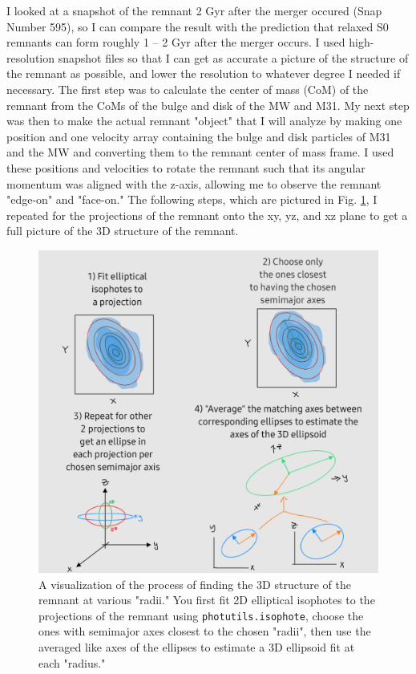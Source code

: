 \documentclass[twocolumn]{aastex631}
\begin{document}
I looked at a snapshot of the remnant 2 Gyr after the merger occured (Snap Number 595), so I can compare the result with the prediction that relaxed S0 remnants can form roughly 1 -- 2 Gyr after the merger occurs.
I used high-resolution snapshot files so that I can get as accurate a picture of the structure of the remnant as possible, and lower the resolution to whatever degree I needed if necessary.
The first step was to calculate the center of mass (CoM) of the remnant from the CoMs of the bulge and disk of the MW and M31. 
My next step was then to make the actual remnant "object" that I will analyze by making one position and one velocity array containing the bulge and disk particles of M31 and the MW and converting them to the remnant center of mass frame. 
I used these positions and velocities to rotate the remnant such that its angular momentum was aligned with the z-axis, allowing me to observe the remnant "edge-on" and "face-on."
The following steps, which are pictured in Fig. \ref{fig:methods}, I repeated for the projections of the remnant onto the xy, yz, and xz plane to get a full picture of the 3D structure of the remnant.
\begin{figure}[h!]
    \centering
    \includegraphics[width=0.8\linewidth]{methods.jpg}
    \caption{
        A visualization of the process of finding the 3D structure of the remnant at various "radii." You first fit 2D elliptical isophotes to the projections of the remnant using \texttt{photutils.isophote}, choose the ones with semimajor axes closest to the chosen "radii", then use the averaged like axes of the ellipses to estimate a 3D ellipsoid fit at each "radius."
    }
    \label{fig:methods}
\end{figure}
\end{document}
